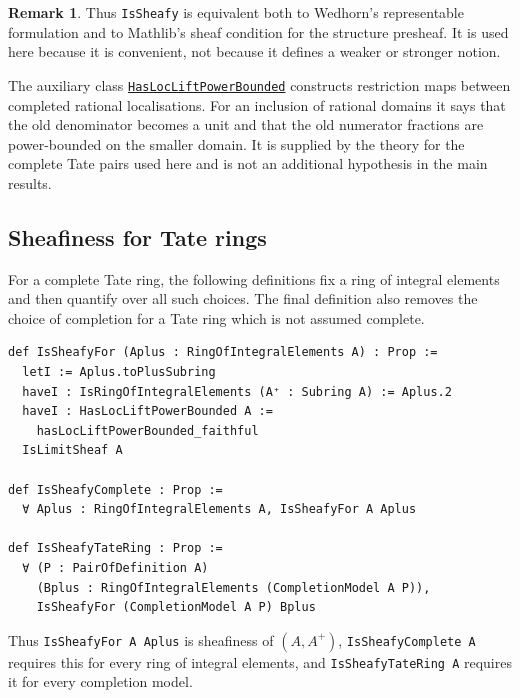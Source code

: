 \documentclass[11pt,reqno]{amsart}
\theoremstyle{definition}
\newtheorem{remark}[remark]{Remark}
\begin{document}
\begin{remark}
Thus \texttt{IsSheafy} is equivalent both to Wedhorn's representable
formulation and to Mathlib's sheaf condition for the structure presheaf.  It is
used here because it is convenient, not because it defines a weaker or
stronger notion.

The auxiliary class
\href{https://cbirkbeck.github.io/uniform-sheafy-tate-domains/lean/AdicSpaces/declarations/ValuationSpectrum.HasLocLiftPowerBounded.html}{\texttt{HasLocLiftPowerBounded}}
constructs restriction maps between completed rational localisations.  For an
inclusion of rational domains it says that the old denominator becomes a unit
and that the old numerator fractions are power-bounded on the smaller domain.
It is supplied by the theory for the complete Tate pairs used here and is not
an additional hypothesis in the main results.
\end{remark}

\subsection{Sheafiness for Tate rings}

For a complete Tate ring, the following definitions fix a ring of integral
elements and then quantify over all such choices.  The final definition also
removes the choice of completion for a Tate ring which is not assumed complete.

\begin{lstlisting}
def IsSheafyFor (Aplus : RingOfIntegralElements A) : Prop :=
  letI := Aplus.toPlusSubring
  haveI : IsRingOfIntegralElements (A⁺ : Subring A) := Aplus.2
  haveI : HasLocLiftPowerBounded A :=
    hasLocLiftPowerBounded_faithful
  IsLimitSheaf A

def IsSheafyComplete : Prop :=
  ∀ Aplus : RingOfIntegralElements A, IsSheafyFor A Aplus

def IsSheafyTateRing : Prop :=
  ∀ (P : PairOfDefinition A)
    (Bplus : RingOfIntegralElements (CompletionModel A P)),
    IsSheafyFor (CompletionModel A P) Bplus
\end{lstlisting}

Thus \texttt{IsSheafyFor A Aplus} is sheafiness of \((A,A^+)\),
\texttt{IsSheafyComplete A} requires this for every ring of integral elements,
and \texttt{IsSheafyTateRing A} requires it for every completion model.
\end{document}
